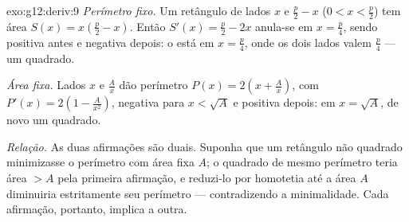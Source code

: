 \begin{solution}{exo:g12:deriv:9}
\emph{Perímetro fixo.} Um retângulo de lados $x$ e $\frac{p}{2} - x$
($0 < x < \frac p2$) tem área $S(x) = x\left(\frac p2 - x\right)$. Então
$S'(x) = \frac p2 - 2x$ anula-se em $x = \frac p4$, sendo positiva antes e
negativa depois: o  está em $x = \frac{p}{4}$, onde os dois lados
valem $\frac p4$ --- um quadrado.

\emph{Área fixa.} Lados $x$ e $\frac Ax$ dão perímetro
$P(x) = 2\left(x + \frac Ax\right)$, com
$P'(x) = 2\left(1 - \frac{A}{x^2}\right)$, negativa para $x < \sqrt A$ e
positiva depois:  em $x = \sqrt{A}$, de novo um quadrado.

\emph{Relação.} As duas afirmações são duais. Suponha que um retângulo não
quadrado minimizasse o perímetro com área fixa $A$; o quadrado de mesmo
perímetro teria área $> A$ pela primeira afirmação, e reduzi-lo por
homotetia até a área $A$ diminuiria estritamente seu perímetro ---
contradizendo a minimalidade. Cada afirmação, portanto, implica a outra.
\end{solution}

